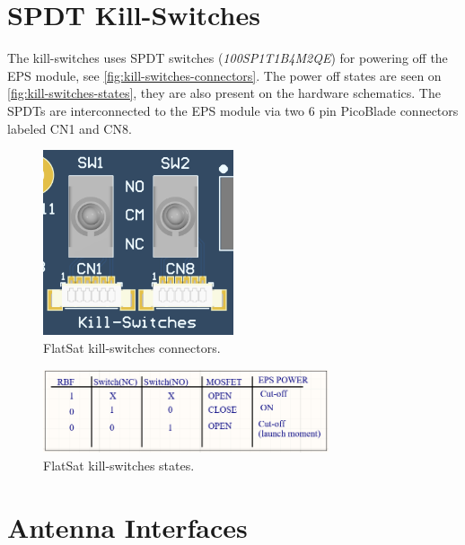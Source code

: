 \section {SPDT Kill-Switches}

The kill-switches uses SPDT switches (\textit{100SP1T1B4M2QE}) for powering off the EPS module, see \autoref{fig:kill-switches-connectors}. The power off states are seen on \autoref{fig:kill-switches-states}, they are also present on the hardware schematics. The SPDTs are interconnected to the EPS module via two 6 pin PicoBlade connectors labeled CN1 and CN8.

\begin{figure}[!ht]
    \begin{center}
        \includegraphics[width=0.5\textwidth]{figures/kill_switches_connectors.png}
        \caption{FlatSat kill-switches connectors.}
        \label{fig:kill-switches-connectors}
    \end{center}
\end{figure}

\begin{figure}[!ht]
    \begin{center}
        \includegraphics[width=0.75\textwidth]{figures/kill_switches_states.png}
        \caption{FlatSat kill-switches states.}
        \label{fig:kill-switches-states}
    \end{center}
\end{figure}

\section{Antenna Interfaces}

